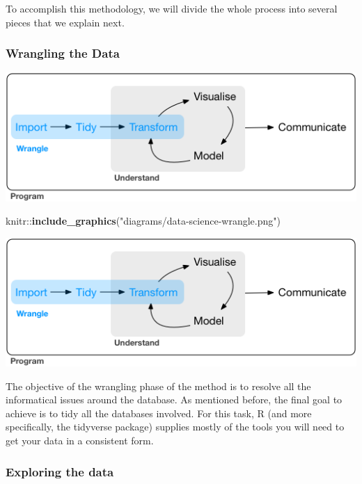 \documentclass[]{book}
\newenvironment{Shaded}{\begin{snugshade}}{\end{snugshade}}
\newcommand{\KeywordTok}[1]{\textcolor[rgb]{0.13,0.29,0.53}{\textbf{{#1}}}}
\newcommand{\StringTok}[1]{\textcolor[rgb]{0.31,0.60,0.02}{{#1}}}
\newcommand{\NormalTok}[1]{{#1}}
\begin{document}
To accomplish this methodology, we will divide the whole process into
several pieces that we explain next.

\subsubsection{Wrangling the Data}\label{wrangling-the-data}

\includegraphics[width=7.18in]{diagrams/data-science-wrangle}

\begin{Shaded}
\begin{Highlighting}[]
\NormalTok{knitr::}\KeywordTok{include_graphics}\NormalTok{(}\StringTok{"diagrams/data-science-wrangle.png"}\NormalTok{)}
\end{Highlighting}
\end{Shaded}

\includegraphics[width=7.18in]{diagrams/data-science-wrangle}

The objective of the wrangling phase of the method is to resolve all the
informatical issues around the database. As mentioned before, the final
goal to achieve is to tidy all the databases involved. For this task, R
(and more specifically, the tidyverse package) supplies mostly of the
tools you will need to get your data in a consistent form.

\subsubsection{Exploring the data}\label{exploring-the-data}
\end{document}

